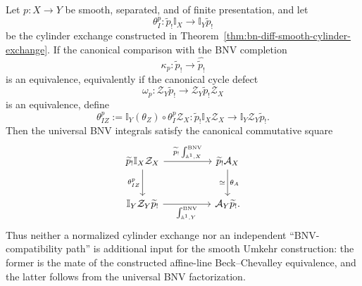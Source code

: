 \begin{theorem}
\label{thm:bn-diff-bnv-umkehr-compat}
Let \(p:X\to Y\) be smooth, separated, and of finite presentation, and let
\[
  \theta_I^p:
  \widetilde p_!\mathbb I_X
  \longrightarrow
  \mathbb I_Y\widetilde p_!
\]
be the cylinder exchange constructed in
Theorem~\ref{thm:bn-diff-smooth-cylinder-exchange}.  If the canonical
comparison with the BNV completion
\[
  \kappa_p:
  \widetilde p_!
  \longrightarrow
  \widehat{\widetilde p_!}
\]
is an equivalence, equivalently if the canonical cycle defect
\[
  \omega_p:
  \mathcal Z_Y\widetilde p_!
  \longrightarrow
  \mathcal Z_Y\widetilde p_!\mathcal Z_X
\]
is an equivalence, define
\[
  \theta_{IZ}^p
  :=
  \mathbb I_Y(\theta_Z)\circ\theta_I^p\mathcal Z_X:
  \widetilde p_!\mathbb I_X\mathcal Z_X
  \longrightarrow
  \mathbb I_Y\mathcal Z_Y\widetilde p_!.
\]
Then the universal BNV integrals satisfy the canonical commutative square
\[
\begin{tikzcd}[column sep=huge,row sep=large]
\widetilde p_!\mathbb I_X\mathcal Z_X
  \ar[r,"\widetilde p_!\int_{\mathbb A^1,X}^{\mathrm{BNV}}"]
  \ar[d,"\theta_{IZ}^p"']
&
\widetilde p_!\mathcal A_X
  \ar[d,"\theta_A","\simeq"']
\\
\mathbb I_Y\mathcal Z_Y\widetilde p_!
  \ar[r,"\int_{\mathbb A^1,Y}^{\mathrm{BNV}}"']
&
\mathcal A_Y\widetilde p_!.
\end{tikzcd}
\]
Thus neither a normalized cylinder exchange nor an independent
``BNV-compatibility path'' is additional input for the smooth Umkehr
construction: the former is the mate of the constructed affine-line
Beck--Chevalley equivalence, and the latter follows from the universal BNV
factorization.
\end{theorem}

